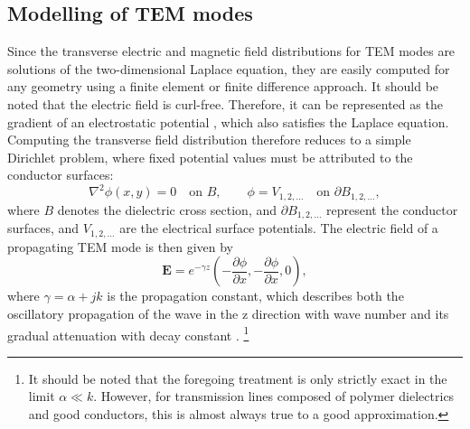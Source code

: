 \subsection{Modelling of TEM modes}\label{modelling-of-tem-modes}

Since the transverse electric and magnetic field distributions for TEM
modes are solutions of the two-dimensional Laplace equation, they are
easily computed for any geometry using a finite element or finite
difference approach. It should be noted that the electric field is
curl-free. Therefore, it can be represented as the gradient of an
electrostatic potential , which also satisfies the Laplace
equation. Computing the transverse field distribution therefore reduces
to a simple Dirichlet problem, where fixed potential values must be
attributed to the conductor surfaces:
%
\begin{equation}
\nabla^2 \phi(x,y)=0 \quad\text{on }B, \qquad \phi=V_{1,2,\dots}\quad\text{on } \partial B_{1,2,\dots}, 
\end{equation}
where $B$ denotes the dielectric cross section, and $\partial B_{1,2,\dots}$
represent the conductor surfaces, and $V_{1,2,\dots}$ are the electrical
surface potentials.
The electric field of a propagating TEM mode is then given by
\begin{equation}
	\mathbf{E}=e^{-\gamma z} \left(-\frac{\partial\phi}{\partial x}, -\frac{\partial\phi}{\partial x},0\right),
\end{equation}
where $\gamma=\alpha+j k$ is the propagation constant, which describes both
the oscillatory propagation of the wave in the z direction with wave
number  and its gradual attenuation with decay constant \m{\alpha}.
\footnote{It should be noted that the foregoing treatment is only strictly exact in the 
limit $\alpha \ll k$. However, for transmission lines composed of polymer
dielectrics and good conductors, this is almost always true to a 
good approximation.}

